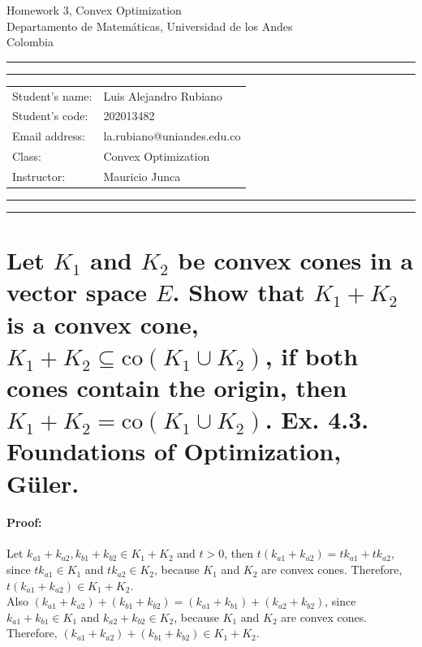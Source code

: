 \documentclass[10pt]{article}
\makeatletter
\newcommand{\studentname}{Luis Alejandro Rubiano}
\newcommand{\studentnumber}{202013482}
\newcommand{\researchcentre}{la.rubiano@uniandes.edu.co}
\newcommand{\projecttitle}{Convex Optimization}
\newcommand{\supervisor}{Mauricio Junca}
\makeatother
\begin{document}
\begin{center}
{\Huge{Homework 3, Convex Optimization}} \\
\vspace{2mm}
{\Large{Departamento de Matemáticas, Universidad de los Andes}} \\
\vspace{1mm}
{\Large{Colombia}}
\end{center}

\vspace{5mm}
\hrule
\vspace{1mm}
\hrule

\vspace{3mm}
\begin{tabular}{ll} 
Student's name:           	        & {\studentname}   \\ 
Student's code: 	        & {\studentnumber} \\ 
Email address: 	        & {\researchcentre}  \\ 
Class: 	& {\projecttitle}  \\ 
Instructor: 	    & {\supervisor}  \\ 
\end{tabular}

\vspace{3mm}
\hrule
\vspace{1mm}
\hrule

\hfill \break %

\section{Let $K_1$ and $K_2$ be convex cones in a vector space $E$. 
Show that $K_1 + K_2$ is a convex cone, $K_1 + K_2 \subseteq \text{co}(K_1 \cup K_2)$, 
if both cones 
contain the origin, then $K_1 + K_2 = \text{co}(K_1 \cup K_2)$. 
Ex. 4.3. Foundations of Optimization, Güler.}

\paragraph{Proof:}

Let $k_{a1} + k_{a2}, k_{b1} + k_{b2} \in K_1 + K_2$ and $t > 0$, then $t (k_{a1} + k_{a2}) = t k_{a1} + t k_{a2}$, since $t k_{a1} \in K_1$ and $t k_{a2} \in K_2$, because $K_1$ and $K_2$ are convex cones. Therefore, $t (k_{a1} + k_{a2}) \in K_1 + K_2$.\\

Also $(k_{a1} + k_{a2}) + (k_{b1} + k_{b2}) = (k_{a1} + k_{b1}) + (k_{a2} + k_{b2})$, since $k_{a1} + k_{b1} \in K_1$ and $k_{a2} + k_{b2} \in K_2$, because $K_1$ and $K_2$ are convex cones. Therefore, $(k_{a1} + k_{a2}) + (k_{b1} + k_{b2}) \in K_1 + K_2$.\\
\end{document}
